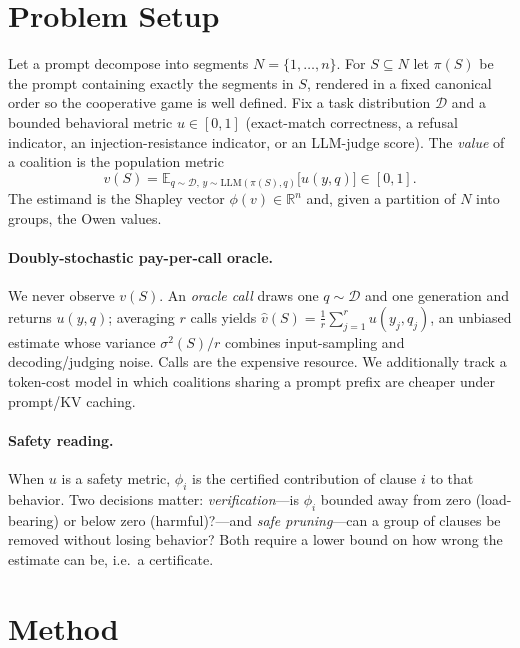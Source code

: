 \documentclass[10pt,twocolumn,letterpaper]{article}
\theoremstyle{plain}
\theoremstyle{definition}
\newcommand{\N}{N}
\newcommand{\shap}{\phi}
\newcommand{\E}{\mathbb{E}}
\newcommand{\R}{\mathbb{R}}
\newcommand{\vhat}{\hat{v}}
\begin{document}
\section{Problem Setup}
\label{sec:setup}

Let a prompt decompose into segments $\N=\{1,\dots,n\}$. For $S\subseteq\N$ let
$\pi(S)$ be the prompt containing exactly the segments in $S$, rendered in a
fixed canonical order so the cooperative game is well defined. Fix a task
distribution $\mathcal{D}$ and a bounded behavioral metric
$u\in[0,1]$ (exact-match correctness, a refusal indicator, an
injection-resistance indicator, or an LLM-judge score). The \emph{value} of a
coalition is the population metric
\begin{equation}
v(S)=\E_{q\sim\mathcal{D},\,y\sim \mathrm{LLM}(\pi(S),q)}\big[u(y,q)\big]\in[0,1].
\end{equation}
The estimand is the Shapley vector $\shap(v)\in\R^n$ and, given a partition of
$\N$ into groups, the Owen values.

\paragraph{Doubly-stochastic pay-per-call oracle.} We never observe $v(S)$. An
\emph{oracle call} draws one $q\sim\mathcal{D}$ and one generation and returns
$u(y,q)$; averaging $r$ calls yields
$\vhat(S)=\frac1r\sum_{j=1}^r u(y_j,q_j)$, an unbiased estimate whose variance
$\sigma^2(S)/r$ combines input-sampling and decoding/judging noise. Calls are
the expensive resource. We additionally track a token-cost model in which
coalitions sharing a prompt prefix are cheaper under prompt/KV caching.

\paragraph{Safety reading.} When $u$ is a safety metric, $\shap_i$ is the
certified contribution of clause $i$ to that behavior. Two decisions matter:
\emph{verification}---is $\shap_i$ bounded away from zero (load-bearing) or
below zero (harmful)?---and \emph{safe pruning}---can a group of clauses be
removed without losing behavior? Both require a lower bound on how wrong the
estimate can be, i.e.\ a certificate.

\section{Method}
\label{sec:method}
\end{document}
